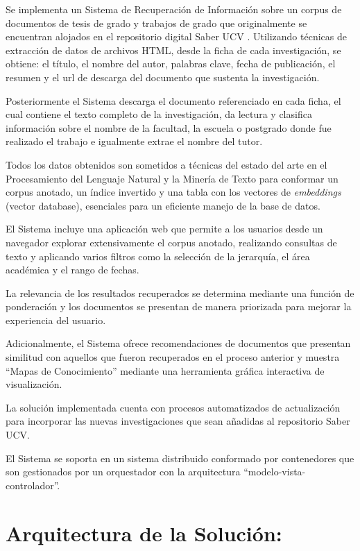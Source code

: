 \documentclass[
  12pt,
  openany]{book}
\begin{document}
Se implementa un Sistema de Recuperación de Información sobre un corpus de documentos de tesis de grado y trabajos de grado que originalmente se encuentran alojados en el repositorio digital Saber UCV . Utilizando técnicas de extracción de datos de archivos HTML, desde la ficha de cada investigación, se obtiene: el título, el nombre del autor, palabras clave, fecha de publicación, el resumen y el url de descarga del documento que sustenta la investigación.

Posteriormente el Sistema descarga el documento referenciado en cada ficha, el cual contiene el texto completo de la investigación, da lectura y clasifica información sobre el nombre de la facultad, la escuela o postgrado donde fue realizado el trabajo e igualmente extrae el nombre del tutor.

Todos los datos obtenidos son sometidos a técnicas del estado del arte en el Procesamiento del Lenguaje Natural y la Minería de Texto para conformar un corpus anotado, un índice invertido y una tabla con los vectores de \emph{embeddings} (vector database), esenciales para un eficiente manejo de la base de datos.

El Sistema incluye una aplicación web que permite a los usuarios desde un navegador explorar extensivamente el corpus anotado, realizando consultas de texto y aplicando varios filtros como la selección de la jerarquía, el área académica y el rango de fechas.

La relevancia de los resultados recuperados se determina mediante una función de ponderación y los documentos se presentan de manera priorizada para mejorar la experiencia del usuario.

Adicionalmente, el Sistema ofrece recomendaciones de documentos que presentan similitud con aquellos que fueron recuperados en el proceso anterior y muestra ``Mapas de Conocimiento'' mediante una herramienta gráfica interactiva de visualización.

La solución implementada cuenta con procesos automatizados de actualización para incorporar las nuevas investigaciones que sean añadidas al repositorio Saber UCV.

El Sistema se soporta en un sistema distribuido conformado por contenedores que son gestionados por un orquestador con la arquitectura ``modelo-vista-controlador''.

\hypertarget{desarrolloarquitectura}{%
\section{Arquitectura de la Solución:}\label{desarrolloarquitectura}}
\end{document}
